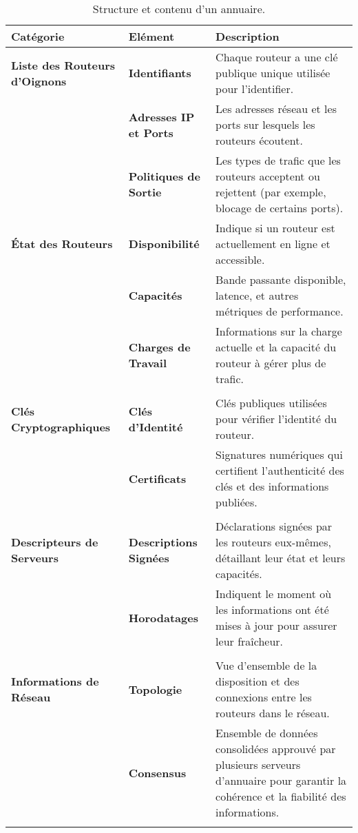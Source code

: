 \begin{table}[htpb]
\centering
\begin{tabularx}{\textwidth}{
    >{\raggedright\arraybackslash}p{4cm}
    >{\raggedright\arraybackslash}p{3cm}
    >{\raggedright\arraybackslash}X}
\toprule
\textbf{Catégorie} & \textbf{Elément} & \textbf{Description} \\
\midrule
\textbf{Liste des Routeurs d'Oignons} & 
   \textbf{Identifiants} & Chaque routeur a une clé publique unique utilisée pour l'identifier. \\
   & \textbf{Adresses IP et Ports} & Les adresses réseau et les ports sur lesquels les routeurs écoutent. \\
   & \textbf{Politiques de Sortie} & Les types de trafic que les routeurs acceptent ou rejettent (par exemple, blocage de certains ports). \\
\midrule
\textbf{État des Routeurs} &
    \textbf{Disponibilité} & Indique si un routeur est actuellement en ligne et accessible. \\
    & \textbf{Capacités} & Bande passante disponible, latence, et autres métriques de performance.\\
    & \textbf{Charges de Travail} & Informations sur la charge actuelle et la capacité du routeur à gérer plus de trafic. \\
 & \\
\midrule
\textbf{Clés Cryptographiques} &
    \textbf{Clés d'Identité} & Clés publiques utilisées pour vérifier l'identité du routeur. \\
    & \textbf{Certificats} & Signatures numériques qui certifient l'authenticité des clés et des informations publiées. \\
 & \\
\midrule
\textbf{Descripteurs de Serveurs} &
    \textbf{Descriptions Signées} & Déclarations signées par les routeurs eux-mêmes, détaillant leur état et leurs capacités. \\
    & \textbf{Horodatages} & Indiquent le moment où les informations ont été mises à jour pour assurer leur fraîcheur. \\
 & \\
\midrule
\textbf{Informations de Réseau} &
    \textbf{Topologie} & Vue d'ensemble de la disposition et des connexions entre les routeurs dans le réseau. \\
    & \textbf{Consensus} & Ensemble de données consolidées approuvé par plusieurs serveurs d'annuaire pour garantir la cohérence et la fiabilité des informations. \\
 & \\
\bottomrule
\end{tabularx}
\caption{Structure et contenu d'un annuaire.}
\label{tab:structure-annuaire}
\end{table}